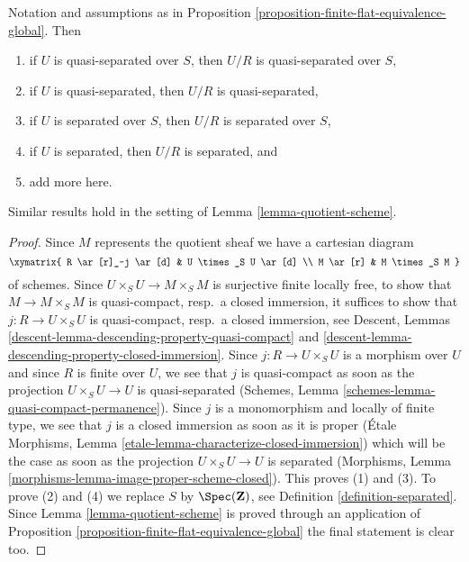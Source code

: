 \begin{lemma}
\label{lemma-quotient-separated}
Notation and assumptions as in
Proposition \ref{proposition-finite-flat-equivalence-global}. Then
\begin{enumerate}
\item if $U$ is quasi-separated over $S$, then $U/R$ is quasi-separated
over $S$,
\item if $U$ is quasi-separated, then $U/R$ is quasi-separated,
\item if $U$ is separated over $S$, then $U/R$ is separated over $S$,
\item if $U$ is separated, then $U/R$ is separated, and
\item add more here.
\end{enumerate}
Similar results hold in the setting of Lemma \ref{lemma-quotient-scheme}.
\end{lemma}

\begin{proof}
Since $M$ represents the quotient sheaf we have a cartesian diagram
$$
\xymatrix{
R \ar[r]_-j \ar[d] & U \times_S U \ar[d] \\
M \ar[r] & M \times_S M
}
$$
of schemes. Since $U \times_S U \to M \times_S M$ is surjective finite locally
free, to show that $M \to M \times_S M$ is quasi-compact, resp.\ a closed
immersion, it suffices to show that $j : R \to U \times_S U$ is
quasi-compact, resp.\ a closed immersion, see
Descent, Lemmas \ref{descent-lemma-descending-property-quasi-compact} and
\ref{descent-lemma-descending-property-closed-immersion}.
Since $j : R \to U \times_S U$ is a morphism over $U$ and since
$R$ is finite over $U$, we see that $j$ is quasi-compact as soon
as the projection $U \times_S U \to U$ is quasi-separated
(Schemes, Lemma \ref{schemes-lemma-quasi-compact-permanence}).
Since $j$ is a monomorphism and locally of finite type, we see that
$j$ is a closed immersion as soon as it is proper
(\'Etale Morphisms, Lemma \ref{etale-lemma-characterize-closed-immersion})
which will be the case as soon as the projection
$U \times_S U \to U$ is separated
(Morphisms, Lemma \ref{morphisms-lemma-image-proper-scheme-closed}).
This proves (1) and (3). To prove (2) and (4) we replace $S$ by
$\Spec(\mathbf{Z})$, see Definition \ref{definition-separated}.
Since Lemma \ref{lemma-quotient-scheme} is proved through an application of
Proposition \ref{proposition-finite-flat-equivalence-global}
the final statement is clear too.
\end{proof}




